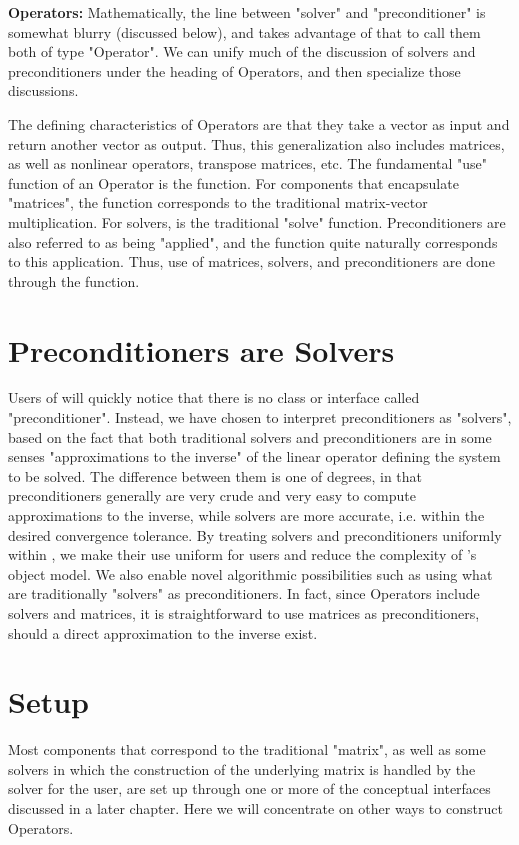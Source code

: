 

{\bf Operators:} Mathematically, the line between "solver" and "preconditioner" is
somewhat blurry (discussed 
below), and \hypre{} takes advantage of that to call them both of type "Operator".
We can unify much of 
the discussion of solvers and preconditioners under the heading of Operators,
and then specialize those 
discussions.

The defining characteristics of Operators are that they take a vector as input
and return another vector as 
output. Thus, this generalization also includes matrices, as well as nonlinear
operators, transpose matrices, 
etc. The fundamental "use" function of an Operator is the  function. For
components that 
encapsulate "matrices", the  function corresponds to the traditional
matrix-vector multiplication. For 
solvers,  is the traditional "solve" function. Preconditioners are also
referred to as being "applied", 
and the  function quite naturally corresponds to this application. Thus,
use of matrices, solvers, and 
preconditioners are done through the  function.

\section{Preconditioners are Solvers}

Users of \hypre{} will quickly notice that there is
no class or interface called 
"preconditioner". Instead, we have chosen to interpret preconditioners as
"solvers", based on the fact that 
both traditional solvers and preconditioners are in some senses "approximations
to the inverse" of the linear 
operator defining the system to be solved. The difference between them is one
of degrees, in that 
preconditioners generally are very crude and very easy to compute
approximations to the inverse, while 
solvers are more accurate, i.e. within the desired convergence tolerance. By
treating solvers and 
preconditioners uniformly within \hypre{}, we make their use uniform for users and
reduce the complexity 
of \hypre{}'s object model. We also enable novel algorithmic possibilities such as
using what are 
traditionally "solvers" as preconditioners. In fact, since Operators include
solvers and matrices, it is 
straightforward to use matrices as preconditioners, should a direct
approximation to the inverse exist. 

\section{Setup}
Most components that correspond to the traditional "matrix", as well as
some solvers in which the 
construction of the underlying matrix is handled by the solver for the user,
are set up through one or more 
of the conceptual interfaces discussed in a later chapter. Here we will
concentrate on other ways to 
construct Operators.